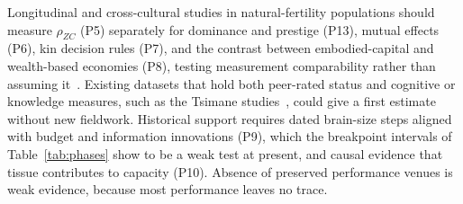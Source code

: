 Longitudinal and cross-cultural studies in natural-fertility populations should measure $\rho_{ZC}$ (P5) separately for
dominance and prestige (P13), mutual effects (P6), kin decision rules (P7), and the contrast between embodied-capital and
wealth-based economies (P8), testing measurement comparability rather than assuming
it~\cite{vonrueden2016,smith2004,smith2017}. Existing datasets that hold both peer-rated status and cognitive or knowledge
measures, such as the Tsimane studies~\cite{vonrueden2008,vonrueden2011,mcdade2007}, could give a first estimate without new
fieldwork. Historical support requires dated brain-size steps aligned with budget and information innovations (P9), which
the breakpoint intervals of Table~\ref{tab:phases} show to be a weak test at present, and causal evidence that tissue
contributes to capacity (P10). Absence of preserved performance venues is weak evidence, because most performance leaves no
trace.

